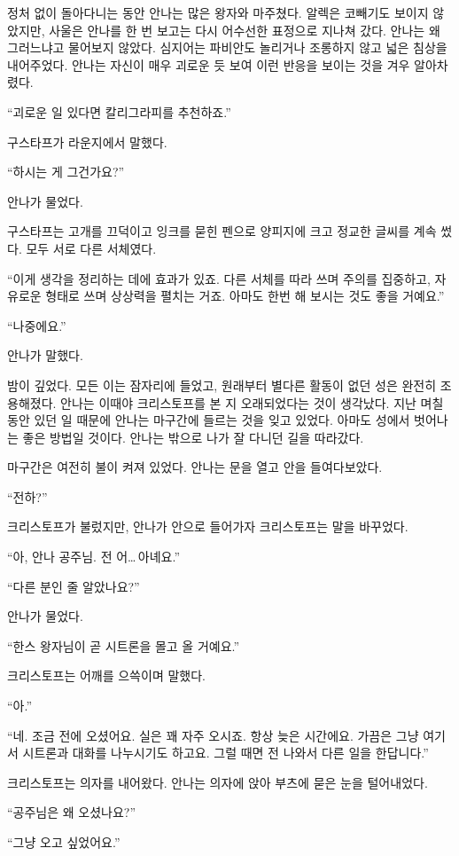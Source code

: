 정처 없이 돌아다니는 동안 안나는 많은 왕자와 마주쳤다. 알렉은 코빼기도 보이지 않았지만, 사울은 안나를 한 번 보고는 다시 어수선한 표정으로 지나쳐 갔다. 안나는 왜 그러느냐고 물어보지 않았다. 심지어는 파비안도 놀리거나 조롱하지 않고 넓은 침상을 내어주었다. 안나는 자신이 매우 괴로운 듯 보여 이런 반응을 보이는 것을 겨우 알아차렸다.

``괴로운 일 있다면 칼리그라피를 추천하죠.''

구스타프가 라운지에서 말했다.

`` 하시는 게 그건가요?''

안나가 물었다.

구스타프는 고개를 끄덕이고 잉크를 묻힌 펜으로 양피지에 크고 정교한 글씨를 계속 썼다. 모두 서로 다른 서체였다.

``이게 생각을 정리하는 데에 효과가 있죠. 다른 서체를 따라 쓰며 주의를 집중하고, 자유로운 형태로 쓰며 상상력을 펼치는 거죠. 아마도 한번 해 보시는 것도 좋을 거예요.''

``나중에요.''

안나가 말했다.

밤이 깊었다. 모든 이는 잠자리에 들었고, 원래부터 별다른 활동이 없던 성은 완전히 조용해졌다. 안나는 이때야 크리스토프를 본 지 오래되었다는 것이 생각났다. 지난 며칠 동안 있던 일 때문에 안나는 마구간에 들르는 것을 잊고 있었다. 아마도 성에서 벗어나는 좋은 방법일 것이다. 안나는 밖으로 나가 잘 다니던 길을 따라갔다.

마구간은 여전히 불이 켜져 있었다. 안나는 문을 열고 안을 들여다보았다.

``전하?''

크리스토프가 불렀지만, 안나가 안으로 들어가자 크리스토프는 말을 바꾸었다.

``아, 안나 공주님. 전 어\ldots\,아녜요.''

``다른 분인 줄 알았나요?''

안나가 물었다.

``한스 왕자님이 곧 시트론을 몰고 올 거예요.''

크리스토프는 어깨를 으쓱이며 말했다.

``아.''

``네. 조금 전에 오셨어요. 실은 꽤 자주 오시죠. 항상 늦은 시간에요. 가끔은 그냥 여기서 시트론과 대화를 나누시기도 하고요. 그럴 때면 전 나와서 다른 일을 한답니다.''

크리스토프는 의자를 내어왔다. 안나는 의자에 앉아 부츠에 묻은 눈을 털어내었다.

``공주님은 왜 오셨나요?''

``그냥 오고 싶었어요.''

